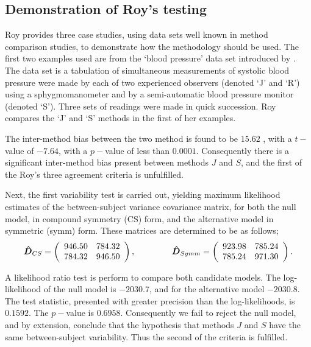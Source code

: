 \documentclass[12pt, a4paper]{report}
\theoremstyle{plain}
\theoremstyle{definition}
\theoremstyle{remark}
\begin{document}
\subsection{Demonstration of Roy's testing}
Roy provides three case studies, using data sets well known in method comparison studies, to demonstrate how the methodology should be used. The first two examples used are from the `blood pressure' data set introduced by \citet{BA99}. The data set is a tabulation of simultaneous measurements of systolic blood pressure were made by each of two experienced observers (denoted `J' and `R') using a sphygmomanometer and by a semi-automatic blood pressure monitor (denoted `S'). Three sets of readings were made in quick succession. Roy compares the `J' and `S' methods in the first of her examples.

The inter-method bias between the two method is found to be $15.62$ , with a $t-$value of $-7.64$, with a $p-$value of less than $0.0001$. Consequently there is a significant inter-method bias present between methods $J$ and $S$, and the first of the Roy's three agreement criteria is unfulfilled.

Next, the first variability test is carried out, yielding maximum likelihood estimates of the between-subject variance covariance matrix, for both the null model, in compound symmetry (CS) form, and the alternative model in symmetric (symm) form. These matrices are determined to be as follows;
\[
\boldsymbol{\hat{D}}_{CS} = \left( \begin{array}{cc}
946.50 & 784.32  \\
784.32 & 946.50  \\
\end{array}\right),
\hspace{1.5cm}
\boldsymbol{\hat{D}}_{Symm} = \left( \begin{array}{cc}
923.98 & 785.24  \\
785.24 & 971.30  \\
\end{array}\right).
\]

A likelihood ratio test is perform to compare both candidate models. The log-likelihood of the null model is $-2030.7$, and for the alternative model $-2030.8$. The test statistic, presented with greater precision than the log-likelihoods, is $0.1592$. The $p-$value is $0.6958$. Consequently we fail to reject the null model, and by extension, conclude that the hypothesis that methods $J$ and $S$ have the same between-subject variability. Thus the second of the criteria is fulfilled.
\end{document}
